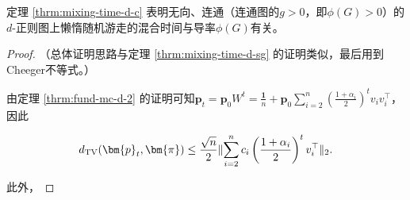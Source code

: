 定理 \ref{thrm:mixing-time-d-c} 表明无向、连通（连通图的$g>0$，即$\phi(G)>0$）的$d$-正则图上懒惰随机游走的混合时间与导率$\phi(G)$有关。

\begin{proof}
    （总体证明思路与定理 \ref{thrm:mixing-time-d-sg} 的证明类似，最后用到Cheeger不等式。）

    由定理 \ref{thrm:fund-mc-d-2} 的证明可知$\bm{p}_t=\bm{p}_0W^t=\frac{\bm{1}}{n}+\bm{p}_0\sum_{i=2}^n{\left(\frac{1+\alpha_i}{2}\right)^tv_iv_i^{\top}}$，因此

    \[
        d_{\textup{TV}}(\bm{p}_t,\bm{\pi})\le \frac{\sqrt{n}}{2}\lVert \sum_{i=2}^n{c_i\left(\frac{1+\alpha_i}{2}\right)^tv_i^{\top}}\rVert_2.
    \]

    此外，
    

\end{proof}
